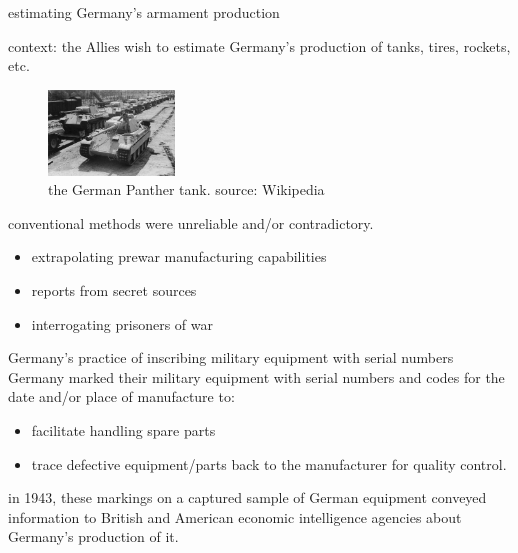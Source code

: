 \documentclass[10pt]{beamer}
\begin{document}
\begin{frame}[t]{estimating Germany's armament production}

	\alert{context:} the Allies wish to estimate Germany's production of tanks, tires, rockets, etc. 
	
	\begin{figure}
		\centering
		\includegraphics[width=0.3\textwidth]{panther_tank.jpg}
		\caption{the German Panther tank. source: Wikipedia}
	\end{figure}

	\pause
	
	conventional methods were unreliable and/or contradictory.
	\begin{itemize}
		\item extrapolating prewar manufacturing capabilities
		\item reports from secret sources
		\item interrogating prisoners of war
	\end{itemize}
	
	\vspace{\baselineskip}
\end{frame}

\begin{frame}[t]{Germany's practice of inscribing military equipment with serial numbers}
	Germany marked their military equipment with serial numbers and codes for the date and/or place of manufacture to:
	\begin{itemize}
		\item facilitate handling spare parts
		\item trace defective equipment/parts back to the manufacturer for quality control.
	\end{itemize}
	
	\pause 
	
	  in 1943, these markings on a captured sample of German equipment conveyed information to British and American economic intelligence agencies about Germany's production of it.
\end{frame}
\end{document}
